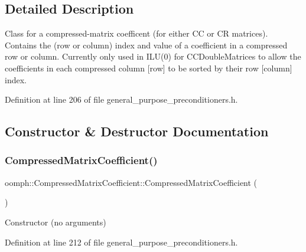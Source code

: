 \subsection{Detailed Description}
Class for a compressed-\/matrix coefficent (for either CC or CR matrices). Contains the (row or column) index and value of a coefficient in a compressed row or column. Currently only used in I\+L\+U(0) for C\+C\+Double\+Matrices to allow the coefficients in each compressed column \mbox{[}row\mbox{]} to be sorted by their row \mbox{[}column\mbox{]} index. 

Definition at line 206 of file general\+\_\+purpose\+\_\+preconditioners.\+h.



\subsection{Constructor \& Destructor Documentation}
\mbox{\label{classoomph_1_1CompressedMatrixCoefficient_a7cbfc9de624baabd04b3501d9970bfb2}} 
\subsubsection{\texorpdfstring{Compressed\+Matrix\+Coefficient()}{CompressedMatrixCoefficient()}\hspace{0.1cm}{\footnotesize\ttfamily [1/3]}}
{\footnotesize\ttfamily oomph\+::\+Compressed\+Matrix\+Coefficient\+::\+Compressed\+Matrix\+Coefficient (\begin{DoxyParamCaption}{ }\end{DoxyParamCaption})\hspace{0.3cm}{\ttfamily [inline]}}



Constructor (no arguments) 



Definition at line 212 of file general\+\_\+purpose\+\_\+preconditioners.\+h.

\mbox{\label{classoomph_1_1CompressedMatrixCoefficient_a80eba1cc000e17b7de0a24dbae74cb13}} 
